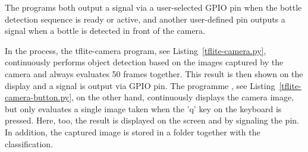 The programs both output a signal via a user-selected GPIO pin when the bottle detection sequence is ready or active, and another user-defined pin outputs a signal when a bottle is detected in front of the camera.

In the process, the tflite-camera program, see Listing~\ref{tflite-camera.py}, continuously performs object detection based on the images captured by the camera and always evaluates 50 frames together. This result is then shown on the display and a signal is output via GPIO pin. The programme , see Listing~\ref{tflite-camera-button.py}, on the other hand, continuously displays the camera image, but only evaluates a single image taken when the 'q' key on the keyboard is pressed. Here, too, the result is displayed on the screen and by signaling the pin. In addition, the captured image is stored in a folder together with the classification.

\begin{code}
  
  \caption{Cyclic evaluation of a live stream}\label{tflite-camera.py}
\end{code}

  
\begin{code}

  \caption{Evaluation of a live stream after button actuation}\label{tflite-camera-button.py}
\end{code}
